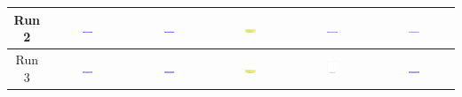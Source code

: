 \begin{table}[H]
\begin{tabular}{|c|c|c|c|c|c|}
    \hline
    Run 2 & \includegraphics[width=0.15\textwidth]{./run_2/png/gpt-4o_results/ViaConnection.png} & \includegraphics[width=0.15\textwidth]{./run_2/png/claude-3-5-sonnet-20240620_results/ViaConnection.png} & \includegraphics[width=0.15\textwidth]{./run_2/png/watsonx_meta-llama_llama-3-1-70b-instruct_results/ViaConnection.png} & \includegraphics[width=0.15\textwidth]{./run_2/png/watsonx_meta-llama_llama-3-405b-instruct_results/ViaConnection.png} & \includegraphics[width=0.15\textwidth]{./run_2/png/o1-preview_results/ViaConnection.png} \\
    \hline
    Run 3 & \includegraphics[width=0.15\textwidth]{./run_3/png/gpt-4o_results/ViaConnection.png} & \includegraphics[width=0.15\textwidth]{./run_3/png/claude-3-5-sonnet-20240620_results/ViaConnection.png} & \includegraphics[width=0.15\textwidth]{./run_3/png/watsonx_meta-llama_llama-3-1-70b-instruct_results/ViaConnection.png} & \includegraphics[width=0.15\textwidth]{./run_3/png/watsonx_meta-llama_llama-3-405b-instruct_results/ViaConnection.png} & \includegraphics[width=0.15\textwidth]{./run_3/png/o1-preview_results/ViaConnection.png} \\
    \hline

\end{tabular}
\end{table}
